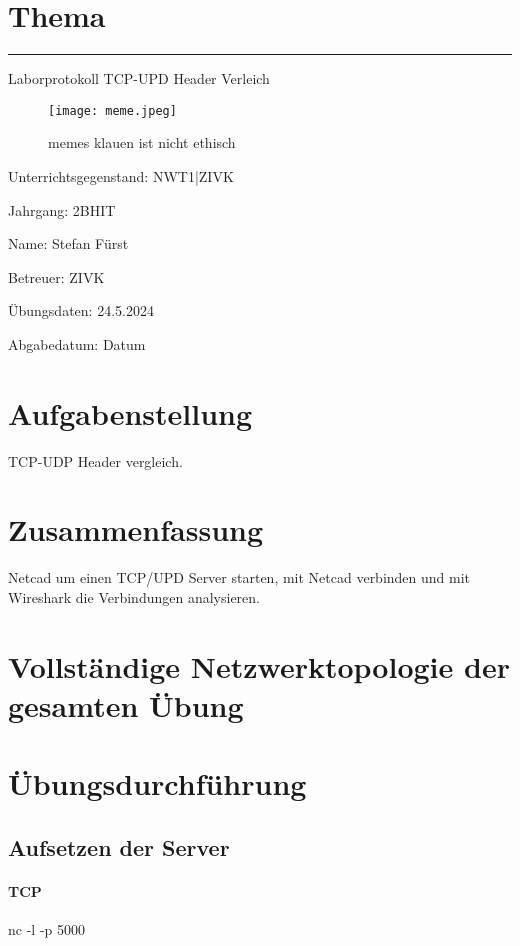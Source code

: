 \documentclass[a4paper]{article}
\begin{document}
\pagestyle{oida}
\section*{Thema}
\par\noindent\rule{\textwidth}{0.4pt}

Laborprotokoll
TCP-UPD Header Verleich

\begin{figure}[h]
	\texttt{[image: meme.jpeg]}
	\caption{memes klauen ist nicht ethisch}
\end{figure}

\vspace*{\fill}
Unterrichtsgegenstand:	NWT1|ZIVK

Jahrgang:	2BHIT

Name:	Stefan Fürst

Betreuer: 	ZIVK

Übungsdaten:	24.5.2024

Abgabedatum:	Datum


\newpage
\tableofcontents

\newpage

\section{Aufgabenstellung}
TCP-UDP Header vergleich.
\section{Zusammenfassung}
Netcad um einen TCP/UPD Server starten, mit Netcad verbinden und mit Wireshark die Verbindungen analysieren.

\newpage

\section{Vollständige Netzwerktopologie der gesamten Übung}

\newpage

\section{Übungsdurchführung}

\subsection{Aufsetzen der Server}
\paragraph{TCP}
nc -l -p 5000
\end{document}
